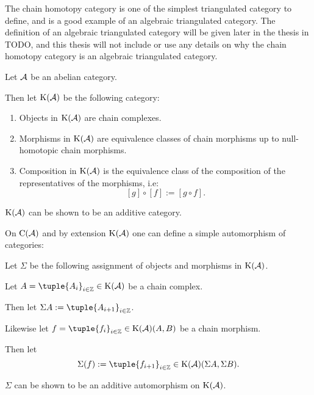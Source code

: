 The chain homotopy category is one of the simplest triangulated category to define, and is a good example of an algebraic triangulated category. The definition of an algebraic triangulated category will be given later in the thesis in TODO, and this thesis will not include or use any details on why the chain homotopy category is an algebraic triangulated category.

\begin{definition}
    \label{def:chain_homotopy_cat}
    Let \( {\mathcal{A}} \) be an abelian category.

    Then let \( \operatorname{K}({\mathcal{A}}) \) be the following category:
    \begin{enumerate}
        \item {
            Objects in \( \operatorname{K}({\mathcal{A}}) \) are chain complexes.
        }
        \item {
            Morphisms in \( \operatorname{K}({\mathcal{A}}) \) are equivalence classes of chain morphisms up to null-homotopic chain morphisms.
        }
        \item {
            Composition in \( \operatorname{K}({\mathcal{A}}) \) is the equivalence class of the composition of the representatives of the morphisms, i.e:
            \[
                [g] \circ [f] := [g \circ f ].
            \]
        }
    \end{enumerate}
\end{definition}

\( \operatorname{K}({\mathcal{A}}) \) can be shown to be an additive category.

On \( \operatorname{C}({\mathcal{A}}) \) and by extension \( \operatorname{K}({\mathcal{A}}) \) one can define a simple automorphism of categories:

\begin{definition}
    \label{def:chain_homotopy_shift}
    Let \( \Sigma \) be the following assignment of objects and morphisms in \( \operatorname{K}({\mathcal{A}}) \).

    Let \( A = \tuple{A_i}_{i \in \Zb} \in \K(\Ac) \) be a chain complex.

    Then let \( \Sigma A := \tuple{A_{i + 1}}_{i \in \Zb} \).

    Likewise let \( f = \tuple{f_i}_{i \in \Zb} \in \K(\Ac)(A, B) \) be a chain morphism.

    Then let
    \[
        \Sigma(f) := \tuple{f_{i + 1}}_{i \in \Zb} \in \K(\Ac)(\Sigma A, \Sigma B).
    \]
\end{definition}

\( \Sigma \) can be shown to be an additive automorphism on \( \operatorname{K}({\mathcal{A}}) \).

